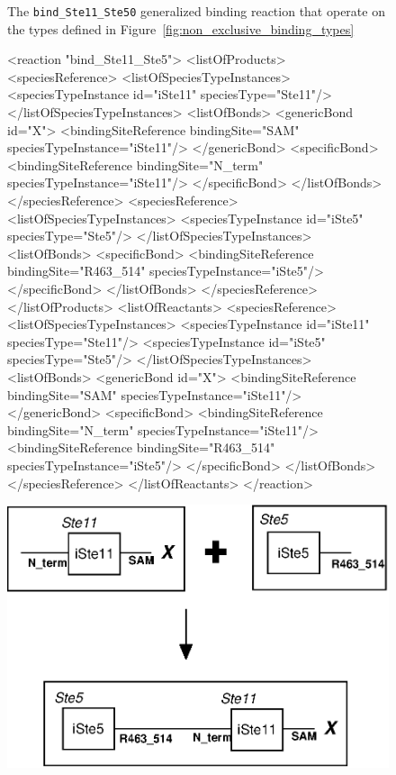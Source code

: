 \documentclass{cekarticle}
\begin{document}
\begin{figure}[h]
  \caption{The \texttt{bind\_Ste11\_Ste50} generalized binding reaction that operate on the types
  defined in Figure~\ref{fig:non_exclusive_binding_types}}
  \label{fig:bind_Ste11_Ste50}
\end{figure}

\begin{figure}[h]
\begin{example}
<reaction "bind_Ste11_Ste5">
    <listOfProducts>
        <speciesReference>
            <listOfSpeciesTypeInstances>
                <speciesTypeInstance id="iSte11" speciesType="Ste11"/>
            </listOfSpeciesTypeInstances>
            <listOfBonds>
                <genericBond id="X">
                    <bindingSiteReference bindingSite="SAM" speciesTypeInstance="iSte11"/>
                </genericBond>
                <specificBond>
                    <bindingSiteReference bindingSite="N_term" speciesTypeInstance="iSte11"/>
                </specificBond>
            </listOfBonds>
        </speciesReference>
        <speciesReference>
            <listOfSpeciesTypeInstances>
                <speciesTypeInstance id="iSte5" speciesType="Ste5"/>
            </listOfSpeciesTypeInstances>
            <listOfBonds>
                <specificBond>
                    <bindingSiteReference bindingSite="R463_514" speciesTypeInstance="iSte5"/>
                </specificBond>
            </listOfBonds>
        </speciesReference>
    </listOfProducts>
    <listOfReactants>
        <speciesReference>
            <listOfSpeciesTypeInstances>
                <speciesTypeInstance id="iSte11" speciesType="Ste11"/>
                <speciesTypeInstance id="iSte5" speciesType="Ste5"/>
            </listOfSpeciesTypeInstances>
            <listOfBonds>
                <genericBond id="X">
                    <bindingSiteReference bindingSite="SAM" speciesTypeInstance="iSte11"/>
                </genericBond>
                <specificBond>
                    <bindingSiteReference bindingSite="N_term" speciesTypeInstance="iSte11"/>
                    <bindingSiteReference bindingSite="R463_514" speciesTypeInstance="iSte5"/>
                </specificBond>
            </listOfBonds>
        </speciesReference>
    </listOfReactants>
</reaction>
\end{example}
  \vspace*{8pt}
  \centering
  \includegraphics[scale = 0.7]{bind_Ste11_Ste5.eps}

\end{figure}
\end{document}
